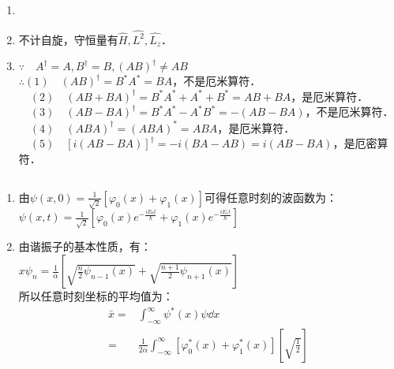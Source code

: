 
\begin{issues}
\issueDraft
\issueTODO
\end{issues}


\subsection{ }
\begin{enumerate}
\item 
\item 不计自旋，守恒量有$\hat H,\hat {L^2},\hat {L_z} $．
\item $\because \quad A^{\dagger} = A,B^{\dagger} = B,(AB)^{\dagger} \neq AB $ \\
$\therefore (1)\quad (AB)^{\dagger} = B^*A^* = BA $，不是厄米算符． \\
$\quad (2)\quad (AB+BA)^{\dagger} = B^*A^*+A^*+B^* = AB+BA $，是厄米算符． \\
$\quad (3)\quad (AB-BA)^{\dagger} = B^*A^*-A^*B^* = -(AB-BA) $，不是厄米算符． \\
$\quad (4)\quad (ABA)^{\dagger} = (ABA)^* = ABA $，是厄米算符． \\
$\quad (5)\quad [i(AB-BA)]^{\dagger} = -i(BA-AB) = i(AB-BA) $，是厄密算符．
\end{enumerate}
\subsection{ }
\begin{enumerate}
\item 由$\psi (x,0) = \frac{1}{\sqrt{2}}[\varphi_{0}(x) + \varphi_{1}(x)] $可得任意时刻的波函数为：\\
$\psi(x,t) = \frac{1}{\sqrt{2}}\left[\varphi_{0}(x)e^{-\frac{iE_{0}t}{\hbar}} + \varphi_{1}(x)e^{-\frac{iE_{1}t}{\hbar}} \right] $
\item 由谐振子的基本性质，有：\\
$x\psi_{n} = \frac{1}{\alpha} \left[\sqrt{\frac{n}{2}\psi_{n-1}(x)} + \sqrt{\frac{n+1}{2}\psi_{n+1}(x)} \right] $ \\
所以任意时刻坐标的平均值为：\\
\begin{equation}
\begin{aligned}
\bar{x} =& \int^{\infty}_{-\infty} \psi^{*}(x)\psi \dd{x} \\
=& \frac{1}{2\alpha} \int^{\infty}_{-\infty} \left[\varphi^{*}_{0}(x)+\varphi^{*}_{1}(x)\right] \left[\sqrt{\frac{1}{2}} \right]
\end{aligned}
\end{equation}


\end{enumerate}

